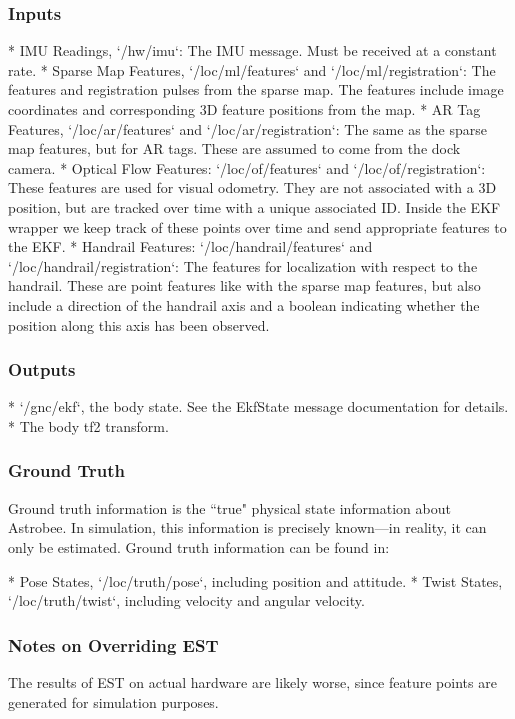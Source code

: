 \documentclass{article}
\begin{document}
\subsubsection{Inputs}
\begin{markdown}
* IMU Readings, `/hw/imu`: The IMU message. Must be received at a constant rate.
* Sparse Map Features, `/loc/ml/features` and `/loc/ml/registration`:
The features and registration pulses from the sparse map. The features include image coordinates and corresponding
3D feature positions from the map.
* AR Tag Features, `/loc/ar/features` and `/loc/ar/registration`: The same as the
sparse map features, but for AR tags. These are assumed to come from the dock camera.
* Optical Flow Features: `/loc/of/features` and `/loc/of/registration`: These
features are used for visual odometry. They are not associated with a 3D position, but are tracked over time
with a unique associated ID. Inside the EKF wrapper we keep track of these points over time and
send appropriate features to the EKF.
* Handrail Features: `/loc/handrail/features` and `/loc/handrail/registration`: The features for
localization with respect to the handrail. These are point features like with the sparse map features, but also
include a direction of the handrail axis and a boolean indicating whether the position along this axis has been observed.
\end{markdown}

\subsubsection{Outputs}
\begin{markdown}
* `/gnc/ekf`, the body state. See the EkfState message documentation for details.
* The body tf2 transform.
\end{markdown}

\subsubsection{Ground Truth}
Ground truth information is the ``true" physical state information about Astrobee. In simulation, this information is precisely known---in reality, it can only be estimated. Ground truth information can be found in:
\begin{markdown}
* Pose States, `/loc/truth/pose`, including position and attitude.
* Twist States, `/loc/truth/twist`, including velocity and angular velocity.
\end{markdown}
\subsubsection{Notes on Overriding EST}
The results of EST on actual hardware are likely worse, since feature points are generated for simulation purposes.
\end{document}
